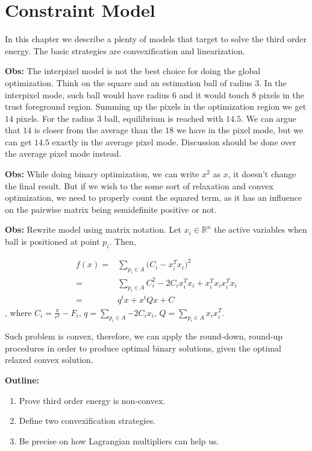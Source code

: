 \chapter{Constraint Model}
\label{chapter:appendix-constraint-model}

In this chapter we describe a plenty of models that target to solve the third order energy. The basic strategies are convexification and linearization.

\textbf{Obs:} The interpixel model is not the best choice for doing the global optimization. Think on the square and an estimation ball of radius $3$. In the interpixel mode, such ball would have radius $6$ and it would touch $8$ pixels in the trust foreground region. Summing up the pixels in the optimization region we get $14$ pixels. For the radius $3$ ball, equilibrium is reached with $14.5$. We can argue that $14$ is closer from the average than the $18$ we have in the pixel mode, but we can get $14.5$ exactly in the average pixel mode. Discussion should be done over the average pixel mode instead.


\textbf{Obs:} While doing binary optimization, we can write $x^2$ as $x$, it doesn't change the final result. But if we wish to the some sort of relaxation and convex optimization, we need to properly count the squared term, as it has an influence on the pairwise matrix being semidefinite positive or not.


\textbf{Obs:} Rewrite model using matrix notation. Let $x_i \in \mathbb{R}^n$ the active variables when ball is positioned at point $p_i$. Then,

\begin{align*}
	f(x) =& \sum_{p_i \in A}{ \big(C_i - x_i^Tx_i\big)^2} \\
	=& \sum_{p_i \in A}{ C_i^2 - 2C_ix_i^Tx_i + x_i^Tx_ix_i^Tx_i } \\
	=& q^tx + x^tQx + C 
\end{align*}
, where $\displaystyle C_i = \frac{\pi}{r^2} - F_i, \,q = \sum_{p_i \in A}{-2C_ix_i},\, Q = \sum_{p_i \in A}{x_ix_i^T}$.

Such problem is convex, therefore, we can apply the round-down, round-up procedures in order to produce optimal binary solutions, given the optimal relaxed convex solution.

\textbf{Outline:} 

\begin{enumerate}
	\item{Prove third order energy is non-convex.}
	\item{Define two convexification strategies.}
	\item{Be precise on how Lagrangian multipliers can help us.}
\end{enumerate}

